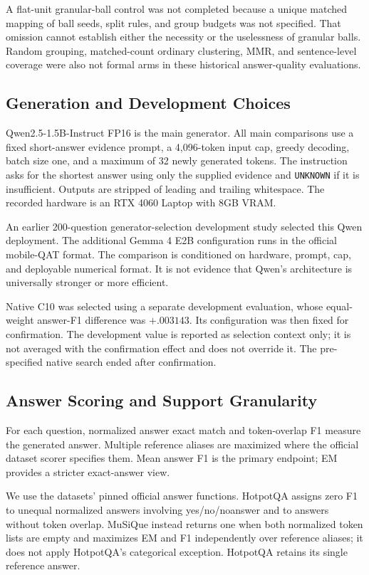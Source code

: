 \documentclass[11pt,a4paper]{article}
\begin{document}
A flat-unit granular-ball control was not completed because a unique matched
mapping of ball seeds, split rules, and group budgets was not specified.
That omission cannot establish either the necessity or the uselessness of
granular balls. Random grouping, matched-count ordinary clustering, MMR,
and sentence-level coverage were also not formal arms in these historical
answer-quality evaluations.

\subsection{Generation and Development Choices}
Qwen2.5-1.5B-Instruct FP16 is the main generator. All main comparisons use a
fixed short-answer evidence prompt, a 4,096-token input cap, greedy decoding,
batch size one, and a maximum of 32 newly generated tokens. The instruction
asks for the shortest answer using only the supplied evidence and
\texttt{UNKNOWN} if it is insufficient. Outputs are stripped of leading and
trailing whitespace. The recorded hardware is an RTX 4060 Laptop with 8GB
VRAM.

An earlier 200-question generator-selection development study selected this
Qwen deployment. The additional Gemma 4 E2B configuration runs in the official
mobile-QAT format. The comparison is conditioned on hardware, prompt, cap,
and deployable numerical format. It is not evidence that Qwen's architecture
is universally stronger or more efficient.

Native C10 was selected using a separate development evaluation, whose
equal-weight answer-F1 difference was $+.003143$. Its configuration was then
fixed for confirmation. The development value is reported as selection
context only; it is not averaged with the confirmation effect and does not
override it. The pre-specified native search ended after confirmation.

\subsection{Answer Scoring and Support Granularity}
For each question, normalized answer exact match and token-overlap F1 measure
the generated answer. Multiple reference aliases are maximized where the
official dataset scorer specifies them. Mean answer F1 is the primary
endpoint; EM provides a stricter exact-answer view.

We use the datasets' pinned official answer functions. HotpotQA assigns zero
F1 to unequal normalized answers involving yes/no/noanswer and to answers
without token overlap. MuSiQue instead returns one when both normalized token
lists are empty and maximizes EM and F1 independently over reference aliases;
it does not apply HotpotQA's categorical exception. HotpotQA retains its single
reference answer.
\end{document}

